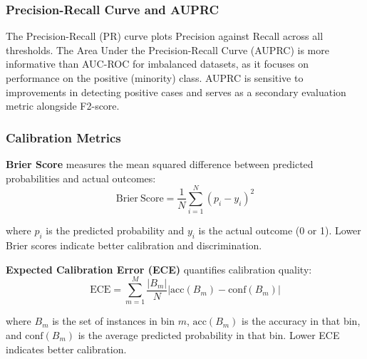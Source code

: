 \subsubsection{Precision-Recall Curve and AUPRC}

The Precision-Recall (PR) curve plots Precision against Recall across all thresholds. The Area Under the Precision-Recall Curve (AUPRC) is more informative than AUC-ROC for imbalanced datasets, as it focuses on performance on the positive (minority) class. AUPRC is sensitive to improvements in detecting positive cases and serves as a secondary evaluation metric alongside F2-score.

\subsubsection{Calibration Metrics}

\textbf{Brier Score} measures the mean squared difference between predicted probabilities and actual outcomes:
$$\mathrm{Brier\ Score} = \frac{1}{N} \sum_{i=1}^{N} (p_i - y_i)^2$$

where $p_i$ is the predicted probability and $y_i$ is the actual outcome (0 or 1). Lower Brier scores indicate better calibration and discrimination.

\textbf{Expected Calibration Error (ECE)} quantifies calibration quality:
$$\mathrm{ECE} = \sum_{m=1}^{M} \frac{|B_m|}{N} |\mathrm{acc}(B_m) - \mathrm{conf}(B_m)|$$

where $B_m$ is the set of instances in bin $m$, $\mathrm{acc}(B_m)$ is the accuracy in that bin, and $\mathrm{conf}(B_m)$ is the average predicted probability in that bin. Lower ECE indicates better calibration.